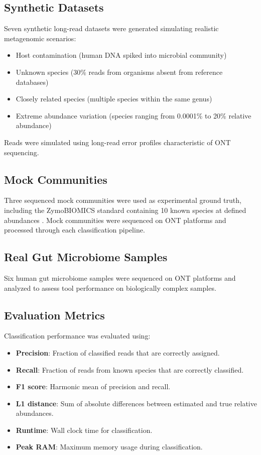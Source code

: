\documentclass[11pt]{article}
\begin{document}
\subsection{Synthetic Datasets}

Seven synthetic long-read datasets were generated simulating realistic metagenomic scenarios:
\begin{itemize}
    \item Host contamination (human DNA spiked into microbial community)
    \item Unknown species (30\% reads from organisms absent from reference databases)
    \item Closely related species (multiple species within the same genus)
    \item Extreme abundance variation (species ranging from 0.0001\% to 20\% relative abundance)
\end{itemize}
Reads were simulated using long-read error profiles characteristic of ONT sequencing.

\subsection{Mock Communities}

Three sequenced mock communities were used as experimental ground truth, including the ZymoBIOMICS standard containing 10 known species at defined abundances \citep{zymo2021mock}. Mock communities were sequenced on ONT platforms and processed through each classification pipeline.

\subsection{Real Gut Microbiome Samples}

Six human gut microbiome samples were sequenced on ONT platforms and analyzed to assess tool performance on biologically complex samples.

\subsection{Evaluation Metrics}

Classification performance was evaluated using:
\begin{itemize}
    \item \textbf{Precision}: Fraction of classified reads that are correctly assigned.
    \item \textbf{Recall}: Fraction of reads from known species that are correctly classified.
    \item \textbf{F1 score}: Harmonic mean of precision and recall.
    \item \textbf{L1 distance}: Sum of absolute differences between estimated and true relative abundances.
    \item \textbf{Runtime}: Wall clock time for classification.
    \item \textbf{Peak RAM}: Maximum memory usage during classification.
\end{itemize}
\end{document}
